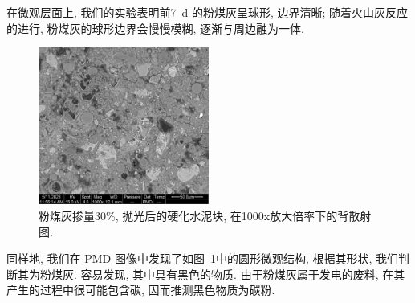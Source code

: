 在微观层面上, 我们的实验表明前\SI{7}{\day} 的粉煤灰呈球形, 边界清晰; 随着火山灰反应的进行, 粉煤灰的球形边界会慢慢模糊, 逐渐与周边融为一体. 





\begin{figure}[!t]
  \centering
  \includegraphics[width = 0.5\textwidth]{assets/30-polished-01000x-PMD.png}
  \caption{粉煤灰掺量30\%, 抛光后的硬化水泥块, 在1000x放大倍率下的背散射图. }
  \label{fig:BSE-FA}
\end{figure}

同样地, 我们在 PMD 图像中发现了如图~\ref{fig:BSE-FA}中的圆形微观结构, 根据其形状, 我们判断其为粉煤灰. 容易发现, 其中具有黑色的物质. 由于粉煤灰属于发电的废料, 在其产生的过程中很可能包含碳, 因而推测黑色物质为碳粉. 



